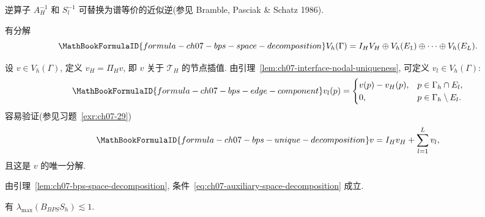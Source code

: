 \begin{Remark}
\label{rem:ch07-bps-inexact-solves}
逆算子 $A_H^{-1}$ 和 $S_l^{-1}$ 可替换为谱等价的近似逆(参见 Bramble, Pasciak \& Schatz 1986).
\end{Remark}

\begin{Lemma}
\label{lem:ch07-bps-space-decomposition}
有分解
\[
\MathBookFormulaID{formula-ch07-bps-space-decomposition}
V_h(\Gamma)=I_HV_H\oplus V_h(E_1)\oplus\cdots\oplus V_h(E_L).
\]
\end{Lemma}

\begin{Proof}
设 $v\in V_h(\Gamma)$, 定义 $v_H=\Pi_Hv$, 即 $v$ 关于 $\mathcal T_H$ 的节点插值. 由引理~\ref{lem:ch07-interface-nodal-uniqueness}, 可定义 $v_l\in V_h(\Gamma)$:
\begin{equation}
\MathBookFormulaID{formula-ch07-bps-edge-component}
\label{eq:ch07-bps-edge-component}
v_l(p)=
\begin{cases}
v(p)-v_H(p),&p\in\Gamma_h\cap E_l,\\
0,&p\in\Gamma_h\setminus E_l.
\end{cases}
\end{equation}
容易验证(参见习题~\ref{exr:ch07-29})
\begin{equation}
\MathBookFormulaID{formula-ch07-bps-unique-decomposition}
\label{eq:ch07-bps-unique-decomposition}
v=I_Hv_H+\sum_{l=1}^{L}v_l,
\end{equation}
且这是 $v$ 的唯一分解.
\end{Proof}

由引理~\ref{lem:ch07-bps-space-decomposition}, 条件~\eqref{eq:ch07-auxiliary-space-decomposition} 成立.

\begin{Lemma}
\label{lem:ch07-bps-maximum-eigenvalue}
有 $\lambda_{\max}(B_{BPS}S_h)\lesssim1$.
\end{Lemma}

